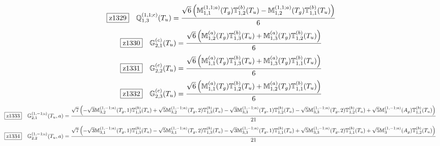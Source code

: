 \documentclass[fleqn,10pt,landscape]{jsarticle}
\begin{document}
\begin{dmath*}
\hspace*{3mm}\fbox{z1329}\quad \mathbb{Q}_{1,3}^{(1,1;c)}(T_{u})=\frac{\sqrt{6} \left(\mathbb{M}_{1,1}^{(1,1;a)}(T_{g}) \mathbb{T}_{1,2}^{(b)}(T_{u}) - \mathbb{M}_{1,2}^{(1,1;a)}(T_{g}) \mathbb{T}_{1,1}^{(b)}(T_{u})\right)}{6}
\end{dmath*}
\begin{dmath*}
\hspace*{3mm}\fbox{z1330}\quad \mathbb{G}_{2,1}^{(c)}(T_{u})=\frac{\sqrt{6} \left(\mathbb{M}_{1,2}^{(a)}(T_{g}) \mathbb{T}_{1,3}^{(b)}(T_{u}) + \mathbb{M}_{1,3}^{(a)}(T_{g}) \mathbb{T}_{1,2}^{(b)}(T_{u})\right)}{6}
\end{dmath*}
\begin{dmath*}
\hspace*{3mm}\fbox{z1331}\quad \mathbb{G}_{2,2}^{(c)}(T_{u})=\frac{\sqrt{6} \left(\mathbb{M}_{1,1}^{(a)}(T_{g}) \mathbb{T}_{1,3}^{(b)}(T_{u}) + \mathbb{M}_{1,3}^{(a)}(T_{g}) \mathbb{T}_{1,1}^{(b)}(T_{u})\right)}{6}
\end{dmath*}
\begin{dmath*}
\hspace*{3mm}\fbox{z1332}\quad \mathbb{G}_{2,3}^{(c)}(T_{u})=\frac{\sqrt{6} \left(\mathbb{M}_{1,1}^{(a)}(T_{g}) \mathbb{T}_{1,2}^{(b)}(T_{u}) + \mathbb{M}_{1,2}^{(a)}(T_{g}) \mathbb{T}_{1,1}^{(b)}(T_{u})\right)}{6}
\end{dmath*}
\begin{dmath*}
\hspace*{3mm}\fbox{z1333}\quad \mathbb{G}_{2,1}^{(1,-1;c)}(T_{u},a)=\frac{\sqrt{7} \left(- \sqrt{3} \mathbb{M}_{3,2}^{(1,-1;a)}(T_{g},1) \mathbb{T}_{1,3}^{(b)}(T_{u}) + \sqrt{5} \mathbb{M}_{3,2}^{(1,-1;a)}(T_{g},2) \mathbb{T}_{1,3}^{(b)}(T_{u}) - \sqrt{3} \mathbb{M}_{3,3}^{(1,-1;a)}(T_{g},1) \mathbb{T}_{1,2}^{(b)}(T_{u}) - \sqrt{5} \mathbb{M}_{3,3}^{(1,-1;a)}(T_{g},2) \mathbb{T}_{1,2}^{(b)}(T_{u}) + \sqrt{5} \mathbb{M}_{3}^{(1,-1;a)}(A_{g}) \mathbb{T}_{1,1}^{(b)}(T_{u})\right)}{21}
\end{dmath*}
\begin{dmath*}
\hspace*{3mm}\fbox{z1334}\quad \mathbb{G}_{2,2}^{(1,-1;c)}(T_{u},a)=\frac{\sqrt{7} \left(- \sqrt{3} \mathbb{M}_{3,1}^{(1,-1;a)}(T_{g},1) \mathbb{T}_{1,3}^{(b)}(T_{u}) - \sqrt{5} \mathbb{M}_{3,1}^{(1,-1;a)}(T_{g},2) \mathbb{T}_{1,3}^{(b)}(T_{u}) - \sqrt{3} \mathbb{M}_{3,3}^{(1,-1;a)}(T_{g},1) \mathbb{T}_{1,1}^{(b)}(T_{u}) + \sqrt{5} \mathbb{M}_{3,3}^{(1,-1;a)}(T_{g},2) \mathbb{T}_{1,1}^{(b)}(T_{u}) + \sqrt{5} \mathbb{M}_{3}^{(1,-1;a)}(A_{g}) \mathbb{T}_{1,2}^{(b)}(T_{u})\right)}{21}
\end{dmath*}
\end{document}
